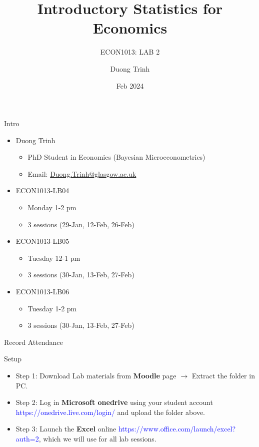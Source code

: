 \documentclass[
  10pt,
  ignorenonframetext,
]{beamer}
\title{Introductory Statistics for Economics}
\subtitle{ECON1013: LAB 2}
\author{Duong Trinh}
\date{Feb 2024}
\institute{University of Glasgow}
\providecommand{\tightlist}{%
  \setlength{\itemsep}{0pt}\setlength{\parskip}{0pt}}
\begin{document}
\frame{\titlepage}

\begin{frame}{Intro}
\protect\hypertarget{intro}{}
\begin{itemize}
\tightlist
\item
  Duong Trinh

  \begin{itemize}
  \tightlist
  \item
    PhD Student in Economics (Bayesian Microeconometrics)
  \item
    Email: \underline{Duong.Trinh@glasgow.ac.uk}
  \end{itemize}
\end{itemize}

\vspace{3mm}

\begin{itemize}
\tightlist
\item
  ECON1013-LB04

  \begin{itemize}
  \tightlist
  \item
    Monday 1-2 pm
  \item
    3 sessions (29-Jan, 12-Feb, 26-Feb)
  \end{itemize}
\item
  ECON1013-LB05

  \begin{itemize}
  \tightlist
  \item
    Tuesday 12-1 pm
  \item
    3 sessions (30-Jan, 13-Feb, 27-Feb)
  \end{itemize}
\item
  ECON1013-LB06

  \begin{itemize}
  \tightlist
  \item
    Tuesday 1-2 pm
  \item
    3 sessions (30-Jan, 13-Feb, 27-Feb)
  \end{itemize}
\end{itemize}

\vspace{3mm}
\end{frame}

\begin{frame}{Record Attendance}
\protect\hypertarget{record-attendance}{}
\end{frame}

\begin{frame}{Setup}
\protect\hypertarget{setup}{}
\begin{itemize}
\item
  Step 1: Download Lab materials from \textbf{Moodle} page
  \(\rightarrow\) Extract the folder in PC.
\item
  Step 2: Log in \textbf{Microsoft onedrive} using your student account
  \textcolor{blue}{https://onedrive.live.com/login/} and upload the
  folder above.
\item
  Step 3: Launch the \textbf{Excel} online
  \textcolor{blue}{https://www.office.com/launch/excel?auth=2}, which we
  will use for all lab sessions.
\end{itemize}
\end{frame}
\end{document}
